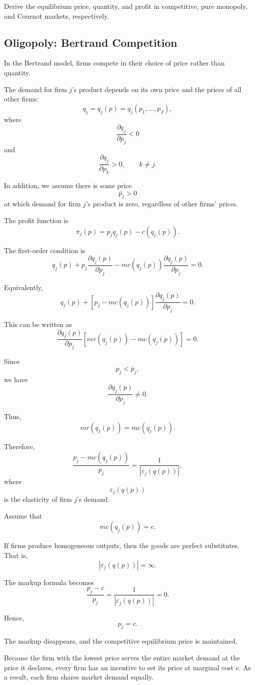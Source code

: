 Derive the equilibrium price, quantity, and profit in competitive, pure monopoly, and Cournot markets, respectively.

\subsection{Oligopoly: Bertrand Competition}

In the Bertrand model, firms compete in their choice of price rather than quantity.

The demand for firm \(j\)'s product depends on its own price and the prices of all other firms:
\[
q_j=q_j(p)=q_j(p_1,\dots,p_J),
\]
where
\[
\frac{\partial q_j}{\partial p_j}<0
\]
and
\[
\frac{\partial q_j}{\partial p_k}>0,
\qquad
k\ne j.
\]

In addition, we assume there is some price
\[
\bar p_j>0
\]
at which demand for firm \(j\)'s product is zero, regardless of other firms' prices.

The profit function is
\[
\pi_j(p)
=
p_jq_j(p)-c(q_j(p)).
\]

The first-order condition is
\[
q_j(p)
+
p_j\frac{\partial q_j(p)}{\partial p_j}
-
mc(q_j(p))
\frac{\partial q_j(p)}{\partial p_j}
=
0.
\]

Equivalently,
\[
q_j(p)
+
\left[
p_j-mc(q_j(p))
\right]
\frac{\partial q_j(p)}{\partial p_j}
=
0.
\]

This can be written as
\[
\frac{\partial q_j(p)}{\partial p_j}
\left[
mr(q_j(p))-mc(q_j(p))
\right]
=
0.
\]

Since
\[
p_j<\bar p_j,
\]
we have
\[
\frac{\partial q_j(p)}{\partial p_j}\ne 0.
\]

Thus,
\[
mr(q_j(p))=mc(q_j(p)).
\]

Therefore,
\[
\frac{
p_j-mc(q_j(p))
}{
p_j
}
=
\frac{1}{|\varepsilon_j(q(p))|},
\]
where
\[
\varepsilon_j(q(p))
\]
is the elasticity of firm \(j\)'s demand.

Assume that
\[
mc(q_j(p))=c.
\]

If firms produce homogeneous outputs, then the goods are perfect substitutes. That is,
\[
|\varepsilon_j(q(p))|=\infty.
\]

The markup formula becomes
\[
\frac{p_j-c}{p_j}
=
\frac{1}{|\varepsilon_j(q(p))|}
=
0.
\]

Hence,
\[
p_j=c.
\]

The markup disappears, and the competitive equilibrium price is maintained.

Because the firm with the lowest price serves the entire market demand at the price it declares, every firm has an incentive to set its price at marginal cost \(c\). As a result, each firm shares market demand equally.

